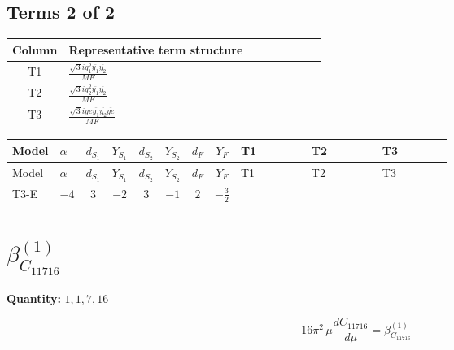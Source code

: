 \documentclass[8pt]{article}
\begin{document}
\begin{landscape}
\subsection*{Terms 2 of 2}
\begin{center}
\begin{tabular}{@{}c >{\raggedright\arraybackslash}p{0.82\linewidth}@{}}
\toprule
Column & Representative term structure \\
\midrule
T1 & \(\displaystyle \frac{\sqrt{3} i g_{1}^{2} \overline{y_{1}} \overline{y_{2}}}{MF}\) \\
\midrule
T2 & \(\displaystyle \frac{\sqrt{3} i g_{2}^{2} \overline{y_{1}} \overline{y_{2}}}{MF}\) \\
\midrule
T3 & \(\displaystyle \frac{\sqrt{3} i ye \overline{y_{1}} \overline{y_{2}} \overline{ye}}{MF}\) \\
\midrule
\bottomrule
\end{tabular}
\end{center}
\smallskip
\tiny
\begin{longtable}{@{}llcccccc >{\raggedright\arraybackslash}p{0.21\linewidth} >{\raggedright\arraybackslash}p{0.21\linewidth} >{\raggedright\arraybackslash}p{0.21\linewidth}@{}}
\toprule
Model & $\alpha$ & $d_{S_1}$ & $Y_{S_1}$ & $d_{S_2}$ & $Y_{S_2}$ & $d_F$ & $Y_F$ & T1 & T2 & T3 \\
\midrule
\endfirsthead
\toprule
Model & $\alpha$ & $d_{S_1}$ & $Y_{S_1}$ & $d_{S_2}$ & $Y_{S_2}$ & $d_F$ & $Y_F$ & T1 & T2 & T3 \\
\midrule
\endhead
T3-E & $-4$ & $3$ & $-2$ & $3$ & $-1$ & $2$ & $-\frac{3}{2}$ & \scriptsize\adjustbox{max width=\linewidth}{$\begin{gathered} \frac{9 \sqrt{3} i g_{1}^{2} \overline{y_{1}} \overline{y_{2}}}{8 MF}\end{gathered}$} & \scriptsize\adjustbox{max width=\linewidth}{$\begin{gathered} \frac{11 \sqrt{3} i g_{2}^{2} \overline{y_{1}} \overline{y_{2}}}{8 MF}\end{gathered}$} & \scriptsize\adjustbox{max width=\linewidth}{$\begin{gathered} - \frac{\sqrt{3} i ye \overline{y_{1}} \overline{y_{2}} \overline{ye}}{12 MF}\end{gathered}$} \\
\midrule
\bottomrule
\end{longtable}
\clearpage
\section*{$\beta_{C_{11716}}^{(1)}$}
\noindent\textbf{Quantity: }$\mathrm{1,1,7,16}$\par\smallskip
\[16\pi^2\,\mu\frac{d C_{11716}}{d\mu}=\beta_{C_{11716}}^{(1)}\]

\end{landscape}
\end{document}
